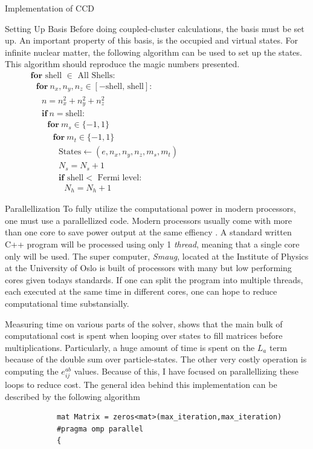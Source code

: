 \documentclass[twoside,english]{uiofysmaster}
\begin{document}
\begin{chapter}{Implementation of CCD}
	\begin{section}{Setting Up Basis}
		Before doing coupled-cluster calculations, the basis must be set up. An important property of this basis, is the occupied and virtual states. For infinite nuclear matter, the following algorithm can be used to set up the states. This algorithm should reproduce the magic numbers presented. 
		\begin{align*}
			&\mathbf{for } \text{ shell } \in \text{ All Shells}: \\
			&\:\:\:\mathbf{for } \: n_x, n_y, n_z \in [-\text{shell, shell} ]: \\
			&\:\:\:\:\:\:n = n_x^2 + n_y^2 + n_z^2 \\
			&\:\:\:\:\:\:\mathbf{if }\: n = \text{shell}: \\
			&\:\:\:\:\:\:\:\:\:\mathbf{for } \: m_s \in \{-1,1\} \\
			&\:\:\:\:\:\:\:\:\:\:\:\: \mathbf{for } \: m_t \in \{-1,1\} \\
			&\:\:\:\:\:\:\:\:\:\:\:\:\:\:\:\text{States} \leftarrow (e, n_x, n_y, n_z, m_s, m_t)\:\:\:\:\:\:\:\:\:\:\:\:\:\:\:\:\:\:\:\:\:\:\:\:\:\:\:\:\:\: \:\:\:\:\:\:\:\:\:\:\:\:\:\:\:\:\:\:\:\:\:\:\:\:\:\:\:\:\:\: \\
			&\:\:\:\:\:\:\:\:\:\:\:\:\:\:\:N_s = N_s + 1 \\
			&\:\:\:\:\:\:\:\:\:\:\:\:\:\:\:\mathbf{if } \text{ shell} < \text{ Fermi level}: \\
			&\:\:\:\:\:\:\:\:\:\:\:\:\:\:\:\:\:\: N_h = N_h + 1
		\end{align*}
	\end{section}

	\begin{section}{Parallellization}
		To fully utilize the computational power in modern processors, one must use a parallellized code. Modern processors usually come with more than one core to save power output at the same effiency \cite{IntelOpenMP}. A standard written C++ program will be processed using only 1 \textit{thread}, meaning that a single core only will be used. The super computer, \textit{Smaug}, located at the Institute of Physics at the University of Oslo is built of processors with many but low performing cores given todays standards. If one can split the program into multiple threads, each executed at the same time in different cores, one can hope to reduce computational time substansially. 
		
		Measuring time on various parts of the solver, shows that the main bulk of computational cost is spent when looping over states to fill matrices before multiplications. Particularly, a huge amount of time is spent on the $L_a$ term because of the double sum over particle-states. The other very costly operation is computing the $e_{ij}^{ab}$ values. Because of this, I have focused on parallellizing these loops to reduce cost. The general idea behind this implementation can be described by the following algorithm
		\begin{lstlisting}
			mat Matrix = zeros<mat>(max_iteration,max_iteration)
			#pragma omp parallel
			{


\end{lstlisting}
\end{section}
\end{chapter}
\end{document}
